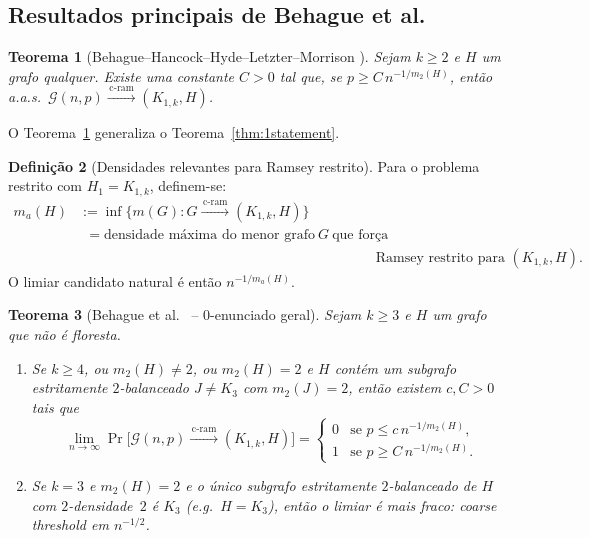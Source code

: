\documentclass[reqno, 12pt]{amsart}
\numberwithin{equation}{section}
\theoremstyle{plain}
\newtheorem{theorem}{Teorema}[section]
\theoremstyle{definition}
\newtheorem{definition}[theorem]{Definição}
\newcommand{\Gnp}{\mathcal{G}(n,p)}
\newcommand{\cram}{\xrightarrow{\,\mathrm{c\text{-}ram}\,}}
\newcommand{\mdens}{m_2}
\newcommand{\maxdens}{m}
\newcommand{\whp}{a.a.s.}
\begin{document}
\subsection{Resultados principais de Behague et al.}

\begin{theorem}[Behague--Hancock--Hyde--Letzter--Morrison \cite{behague2025thresholds}]
    \label{thm:behague-1-stmt}
    Sejam $k \ge 2$ e $H$ um grafo qualquer.
    Existe uma constante $C > 0$ tal que, se $p \ge C\, n^{-1/\mdens(H)}$, então
    \whp\ $\Gnp \cram (K_{1,k}, H)$.
\end{theorem}

O Teorema~\ref{thm:behague-1-stmt} generaliza o Teorema~\ref{thm:1statement}.

\begin{definition}[Densidades relevantes para Ramsey restrito]
    Para o problema restrito com $H_1 = K_{1,k}$, definem-se:
    \begin{align*}
        m_a(H) & := \inf\!\bigl\{\maxdens(G) : G \cram (K_{1,k}, H)\bigr\}                                                        \\
               & \phantom{:}= \text{densidade máxima do menor grafo} \ G\ \text{que força }                                       \\
               & \phantom{= \text{densidade máxima do menor grafo} G \text{que força}} \text{Ramsey restrito para } (K_{1,k}, H).
    \end{align*}
    O limiar candidato natural é então $n^{-1/m_a(H)}$.
\end{definition}

\begin{theorem}[Behague et al.\ \cite{behague2025thresholds} -- $0$-enunciado geral]
    \label{thm:behague-0-stmt}
    Sejam $k \ge 3$ e $H$ um grafo que não é floresta.
    \begin{enumerate}
        \item[(a)] Se $k \ge 4$, \emph{ou} $\mdens(H) \ne 2$, \emph{ou}
              $\mdens(H) = 2$ e $H$ contém um subgrafo estritamente $2$-balanceado
              $J \ne K_3$ com $\mdens(J) = 2$,
              então existem $c, C > 0$ tais que
              \[
                  \lim_{n\to\infty} \Pr\!\bigl[\Gnp \cram (K_{1,k}, H)\bigr] =
                  \begin{cases}
                      0 & \text{se } p \le c\, n^{-1/\mdens(H)}, \\
                      1 & \text{se } p \ge C\, n^{-1/\mdens(H)}.
                  \end{cases}
              \]
        \item[(b)] Se $k = 3$ e $\mdens(H) = 2$ e o único subgrafo estritamente
              $2$-balanceado de $H$ com $2$-densidade~$2$ é $K_3$ (e.g.\ $H = K_3$),
              então o limiar é mais fraco: coarse threshold em $n^{-1/2}$.
    \end{enumerate}
\end{theorem}
\end{document}
